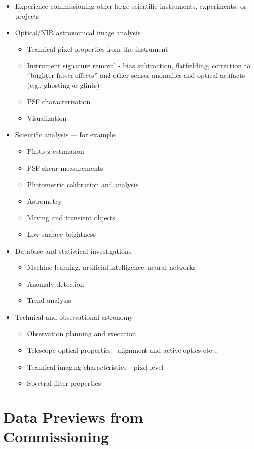 \documentclass[SE,authoryear,toc]{lsstdoc}
\begin{document}
\begin{itemize}
\item Experience commissioning other large scientific instruments, experiments, or projects
\item Optical/NIR astronomical image analysis
	\begin{itemize}
	\item Technical pixel properties from the instrument
	\item Instrument signature removal - bias subtraction, flatfielding, correction to ``brighter fatter effects'' and other sensor anomalies and optical artifacts (e.g., ghosting or glints)
	\item PSF characterization
	\item Visualization
	\end{itemize}
\item Scientific analysis --- for example:
\begin{itemize}
	\item Photo-z estimation
	\item PSF shear measurements
	\item Photometric calibration and analysis
	\item Astrometry
	\item Moving and transient objects
	\item Low surface brightness
\end{itemize}
\item Database and statistical investigations
	\begin{itemize}
	\item Machine learning, artificial intelligence, neural networks
	\item Anomaly detection
	\item Trend analysis
\end{itemize}
\item Technical and observational astronomy
	\begin{itemize}
	\item Observation planning and execution
	\item Telescope optical properties - alignment and active optics etc...
	\item Technical imaging characteristics - pixel level
	\item Spectral filter properties
	\end{itemize}
\end{itemize}

\appendix

\section{Data Previews from Commissioning}
\end{document}
